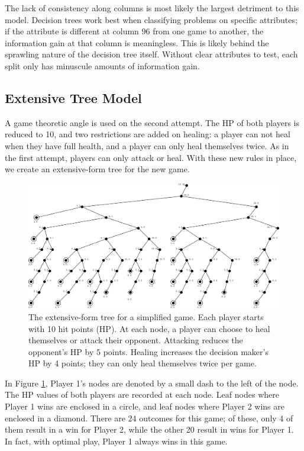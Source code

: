 The lack of consistency along columns is most likely the largest detriment to this model. Decision trees work best when classifying problems on specific attributes; if the attribute is different at column 96 from one game to another, the information gain at that column is meaningless. This is likely behind the sprawling nature of the decision tree itself. Without clear attributes to test, each split only has minuscule amounts of information gain.

\subsection{Extensive Tree Model}
A game theoretic angle is used on the second attempt. The HP of both players is reduced to 10, and two restrictions are added on healing: a player can not heal when they have full health, and a player can only heal themselves twice. As in the first attempt, players can only attack or heal. With these new rules in place, we create an extensive-form tree for the new game.\\

\begin{figure}[H]
  \centering
  \includegraphics[width=14cm]{figures/GameTree.png}
  \caption{The extensive-form tree for a simplified game. Each player starts with 10 hit points (HP). At each node, a player can choose to heal themselves or attack their opponent. Attacking reduces the opponent's HP by 5 points. Healing increases the decision maker's HP by 4 points; they can only heal themselves twice per game.}
  \label{fig:gameTree}
\end{figure}

In Figure \ref{fig:gameTree}, Player 1's nodes are denoted by a small dash to the left of the node. The HP values of both players are recorded at each node. Leaf nodes where Player 1 wins are enclosed in a circle, and leaf nodes where Player 2 wins are enclosed in a diamond. There are 24 outcomes for this game; of these, only 4 of them result in a win for Player 2, while the other 20 result in wins for Player 1. In fact, with optimal play, Player 1 always wins in this game.\\

